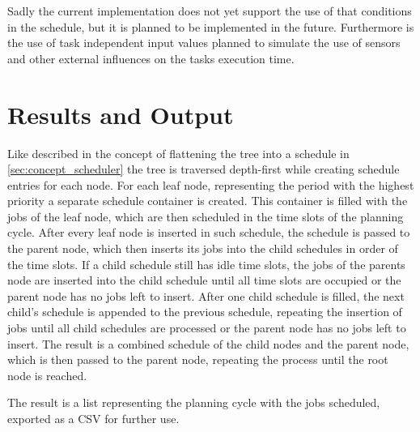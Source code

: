 Sadly the current implementation does not yet support the use of that conditions in the schedule, but it is planned to be implemented in the future.
Furthermore is the use of task independent input values planned to simulate the use of sensors and other external influences on the tasks execution time.


\section{Results and Output}\label{sec:creating-schedule}
Like described in the concept of flattening the tree into a schedule in \cref{sec:concept_scheduler} the tree is traversed depth-first while creating schedule entries for each node.
For each leaf node, representing the period with the highest priority a separate schedule container is created.
This container is filled with the jobs of the leaf node, which are then scheduled in the time slots of the planning cycle.
After every leaf node is inserted in such schedule, the schedule is passed to the parent node, which then inserts its jobs into the child schedules in order of the time slots.
If a child schedule still has idle time slots, the jobs of the parents node are inserted into the child schedule until all time slots are occupied or the parent node has no jobs left to insert.
After one child schedule is filled, the next child's schedule is appended to the previous schedule, repeating the insertion of jobs until all child schedules are processed or the parent node has no jobs left to insert.
The result is a combined schedule of the child nodes and the parent node, which is then passed to the parent node, repeating the process until the root node is reached.

The result is a list representing the planning cycle with the jobs scheduled, exported as a CSV for further use.